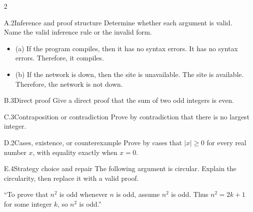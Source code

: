 \documentclass[9pt]{extarticle}
\begin{document}
\begin{multicols}{2}
\begin{CoreProblem}{A.2}{Inference and proof structure}
Determine whether each argument is valid. Name the valid inference rule or the invalid form.
\begin{itemize}
  \item (a) If the program compiles, then it has no syntax errors. It has no syntax errors. Therefore, it compiles.
  \item (b) If the network is down, then the site is unavailable. The site is
        available. Therefore, the network is not down.
\end{itemize}
\end{CoreProblem}
\begin{CoreProblem}{B.3}{Direct proof}
Give a direct proof that the sum of two odd integers is even.
\end{CoreProblem}
\begin{CoreProblem}{C.3}{Contraposition or contradiction}
Prove by contradiction that there is no largest integer.
\end{CoreProblem}
\columnbreak
\begin{CoreProblem}{D.2}{Cases, existence, or counterexample}
Prove by cases that $|x|\ge 0$ for every real number $x$, with equality exactly when $x=0$.
\end{CoreProblem}
\begin{CoreProblem}{E.4}{Strategy choice and repair}
The following argument is circular. Explain the circularity, then replace it with a valid proof.

``To prove that $n^2$ is odd whenever $n$ is odd, assume $n^2$ is odd. Thus
$n^2=2k+1$ for some integer $k$, so $n^2$ is odd.''
\end{CoreProblem}
\end{multicols}
\CoreWorkArea
\FormBreak
{}
\end{document}
